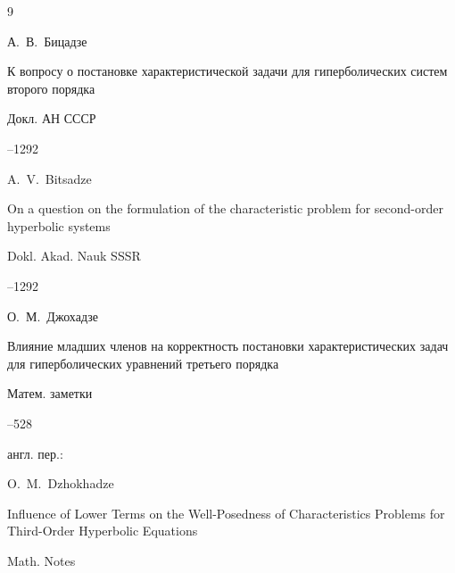 \begin{thebibliography}{9}




\by А.~В.~Бицадзе

\paper  К вопросу о постановке характеристической задачи для гиперболических систем второго порядка 

\jour Докл. АН СССР




–1292 

\misctransl

\by A.~V.~Bitsadze

\paper On a question on the formulation of the characteristic problem for second-order hyperbolic systems

\jour Dokl. Akad. Nauk SSSR



–1292 





\by О.~М.~Джохадзе

\paper Влияние младших членов на корректность постановки характеристических задач для гиперболических уравнений третьего порядка

\jour Матем. заметки




--528





\transl англ. пер.:~

\by O.~M.~Dzhokhadze

\paper Influence of Lower Terms on the Well-Posedness of Characteristics Problems for Third-Order Hyperbolic Equations

\jour Math. Notes



\end{thebibliography}

